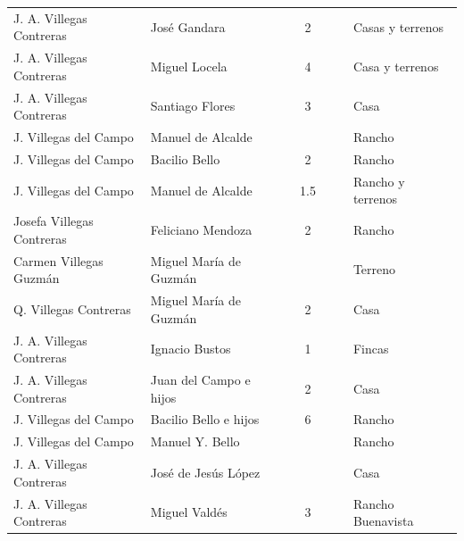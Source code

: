 \documentclass[14pt,twoside,final]{extbook} %
\begin{document}
{\begin{longtable}[c]{@{}p{2.5cm}lrSrrl@{}}
J. A. Villegas Contreras & José Gandara &  & 2 &  &  & Casas y terrenos \\
J. A. Villegas Contreras & Miguel Locela &  & 4 &  &  & Casa y terrenos \\
J. A. Villegas Contreras & Santiago Flores &  & 3 &  &  & Casa \\
J. Villegas del Campo & Manuel de Alcalde &  & &  &  & Rancho \\
J. Villegas del Campo & Bacilio Bello &  & 2 & {} & {} & Rancho \\
J. Villegas del Campo & Manuel de Alcalde &  & 1.5 &  &  & Rancho y terrenos \\
Josefa Villegas Contreras & Feliciano Mendoza &  & 2 & {} & {} & Rancho \\
Carmen Villegas Guzmán & Miguel María de Guzmán &  & {} & {} & {} & Terreno \\
Q. Villegas Contreras & Miguel María de Guzmán &  & 2 & {} & {} & Casa \\
J. A. Villegas Contreras & Ignacio Bustos &  & 1 &  &  & Fincas \\
J. A. Villegas Contreras & Juan del Campo e hijos &  & 2 &  &  & Casa \\
J. Villegas del Campo & Bacilio Bello e hijos &  & 6 & {} & {} & Rancho \\
J. Villegas del Campo & Manuel Y. Bello &  & {} & {} & {} & Rancho \\
J. A. Villegas Contreras & José de Jesús López &  & {} & {} & {} & Casa \\
J. A. Villegas Contreras & Miguel Valdés &  & 3 &  &  & Rancho Buenavista \\

\end{longtable}}
\end{document}
